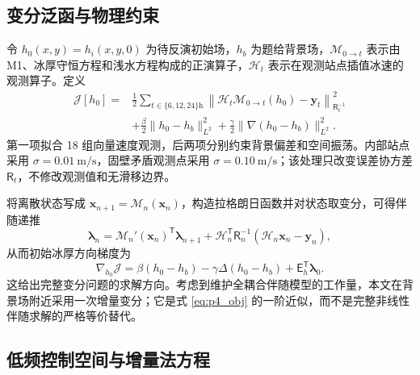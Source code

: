 \documentclass[UTF8,fontset=none]{ctexart}
\newcommand{\vect}[1]{\boldsymbol{#1}}
\begin{document}
\subsection{变分泛函与物理约束}

令 $h_0(x,y)=h_i(x,y,0)$ 为待反演初始场，$h_b$ 为题给背景场，$\mathcal M_{0\to t}$ 表示由 M1、冰厚守恒方程和浅水方程构成的正演算子，$\mathcal H_t$ 表示在观测站点插值冰速的观测算子。定义
\begin{equation}
\begin{aligned}
\mathcal J[h_0]
=&\frac12\sum_{t\in\{6,12,24\}\mathrm h}
\left\|
\mathcal H_t\mathcal M_{0\to t}(h_0)-\vect y_t
\right\|_{\mathsf R_t^{-1}}^2\\
&+\frac{\beta}{2}\|h_0-h_b\|_{L^2}^2
+\frac{\gamma}{2}\|\nabla(h_0-h_b)\|_{L^2}^2.
\end{aligned}
\label{eq:p4_obj}
\end{equation}
第一项拟合 18 组向量速度观测，后两项分别约束背景偏差和空间振荡。内部站点采用 $\sigma=0.01\ \mathrm{m/s}$，固壁矛盾观测点采用 $\sigma=0.10\ \mathrm{m/s}$；该处理只改变误差协方差 $\mathsf R_t$，不修改观测值和无滑移边界。

将离散状态写成 $\vect x_{n+1}=\mathcal M_n(\vect x_n)$，构造拉格朗日函数并对状态取变分，可得伴随递推
\begin{equation}
\vect\lambda_n
=\mathcal M_n'(\vect x_n)^\mathsf T\vect\lambda_{n+1}
+\mathcal H_n^\mathsf T\mathsf R_n^{-1}
(\mathcal H_n\vect x_n-\vect y_n),
\end{equation}
从而初始冰厚方向梯度为
\begin{equation}
\nabla_{h_0}\mathcal J
=\beta(h_0-h_b)-\gamma\Delta(h_0-h_b)
+\mathsf E_h^\mathsf T\vect\lambda_0.
\end{equation}
这给出完整变分问题的求解方向。考虑到维护全耦合伴随模型的工作量，本文在背景场附近采用一次增量变分；它是式 \eqref{eq:p4_obj} 的一阶近似，而不是完整非线性伴随求解的严格等价替代。

\subsection{低频控制空间与增量法方程}
\end{document}
